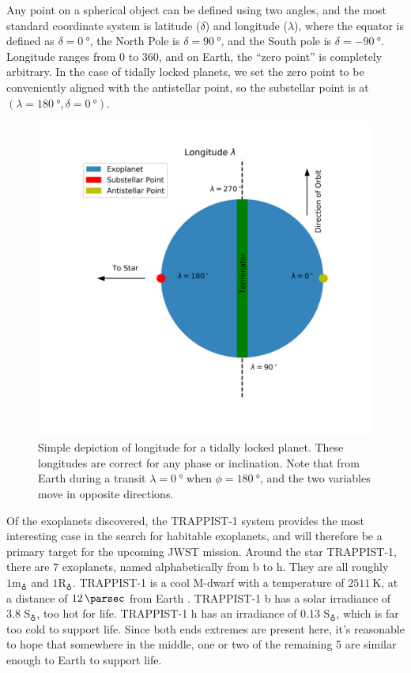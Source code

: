 Any point on a spherical object can be defined using two angles, and the most
 standard coordinate system is latitude ($\delta$) and longitude ($\lambda$), where the
 equator is defined as $\delta=\SI{0}{\degree}$, the North Pole is
 $\delta=\SI{90}{\degree}$, and the South pole is $\delta=\SI{-90}{\degree}$.
 Longitude ranges from 0 to 360, and on Earth, the ``zero point'' is completely
 arbitrary. In the case of tidally locked planets, we set the zero point to be
 conveniently aligned with the antistellar point, so the substellar point is at
 $(\lambda=\SI{180}{\degree}, \delta=\SI{0}{\degree})$.

\begin{figure}[ht]
    \centering
    \includegraphics[width=5in]{background/longitude_diagram.png}
    \caption[Definition of Longitude]{Simple depiction of longitude for a
    tidally locked planet. These longitudes are correct for any phase or
    inclination. Note that from Earth during a transit $\lambda=\SI{0}{\degree}$
    when $\phi=\SI{180}{\degree}$, and the two variables move in opposite directions.}
    \label{longitudediagram}
\end{figure}

Of the exoplanets discovered, the TRAPPIST-1 system provides the most
 interesting case in the search for habitable exoplanets, and will therefore be
 a primary target for the upcoming JWST mission. Around the star TRAPPIST-1,
 there are 7 exoplanets, named alphabetically from b to h. They are all roughly
 $1\mathrm{m}_\earth$ and $1\mathrm{R}_\earth$. TRAPPIST-1 is a cool
 M-dwarf
 with a temperature of $\SI{2511}{\kelvin}$, at a distance of $\SI{12}{\parsec}$ from
 Earth \citep{trappisttemp}. TRAPPIST-1 b has a solar irradiance of
 3.8 $\mathrm{S}_\earth$, too hot for life.
 TRAPPIST-1 h has an irradiance of 0.13 $\mathrm{S}_\earth$, which is
 far too cold to support life. Since both ends extremes are present here,
 it's reasonable to hope that somewhere in the middle, one or two of the
 remaining 5 are similar enough to Earth to support life.

